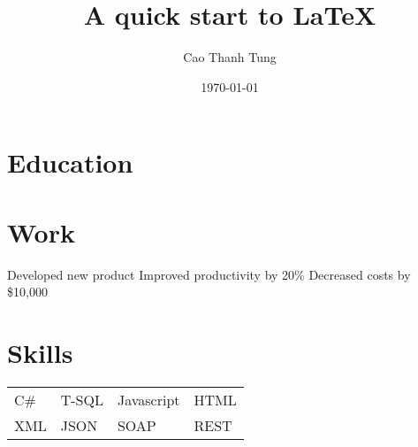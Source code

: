 \documentclass{myclass}
\author{Cao Thanh Tung} %
\title{A quick start to \LaTeX{}} %
\date{\today{}} %
\begin{document}




\section{Education}

\section{Work}
\workitems
{Developed new product}
{Improved productivity by 20\%}
{Decreased costs by \$10,000}
 
\section{Skills}
\begin{tabular}{l l l l}
	C\# & T-SQL & Javascript & HTML \\
	XML & JSON & SOAP & REST
\end{tabular}
\end{document}
